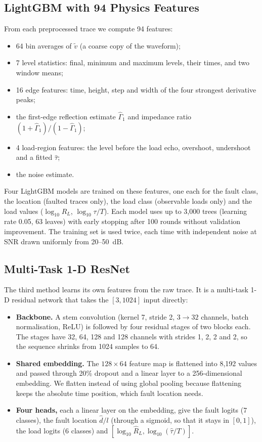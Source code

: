 \subsection{LightGBM with 94 Physics Features}
From each preprocessed trace we compute 94 features:
\begin{itemize}
    \item 64 bin averages of $\tilde v$ (a coarse copy of the waveform);
    \item 7 level statistics: final, minimum and maximum levels, their times, and two window means;
    \item 16 edge features: time, height, step and width of the four strongest derivative peaks;
    \item the first-edge reflection estimate $\hat\Gamma_1$ and impedance ratio $(1+\hat\Gamma_1)/(1-\hat\Gamma_1)$;
    \item 4 load-region features: the level before the load echo, overshoot, undershoot and a fitted $\hat\tau$;
    \item the noise estimate.
\end{itemize}
Four LightGBM \cite{ke2017lightgbm} models are trained on these features, one each for the fault class, the location (faulted traces only), the load class (observable loads only) and the load values ($\log_{10}R_L$, $\log_{10}\tau/T$). Each model uses up to 3,000 trees (learning rate 0.05, 63 leaves) with early stopping after 100 rounds without validation improvement. The training set is used twice, each time with independent noise at SNR drawn uniformly from 20--50~dB.

\subsection{Multi-Task 1-D ResNet}
The third method learns its own features from the raw trace. It is a multi-task 1-D residual network \cite{he2016deep} that takes the $[3, 1024]$ input directly:
\begin{itemize}
    \item \textbf{Backbone.} A stem convolution (kernel 7, stride 2, $3 \to 32$ channels, batch normalisation, ReLU) is followed by four residual stages of two blocks each. The stages have 32, 64, 128 and 128 channels with strides 1, 2, 2 and 2, so the sequence shrinks from 1024 samples to 64.
    \item \textbf{Shared embedding.} The $128 \times 64$ feature map is flattened into 8,192 values and passed through 20\% dropout and a linear layer to a 256-dimensional embedding. We flatten instead of using global pooling because flattening keeps the absolute time position, which fault location needs.
    \item \textbf{Four heads,} each a linear layer on the embedding, give the fault logits (7 classes), the fault location $\hat d/l$ (through a sigmoid, so that it stays in $[0,1]$), the load logits (6 classes) and $[\log_{10}\hat R_L, \log_{10}(\hat\tau/T)]$.
\end{itemize}


